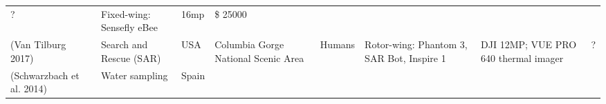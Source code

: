 \documentclass[]{interact}
\theoremstyle{plain}%
\theoremstyle{definition}
\theoremstyle{remark}
\begin{document}
\begin{longtable}[]{@{}llllllll@{}}
\begin{minipage}[t]{0.10\columnwidth}
?\strut
\end{minipage} & \begin{minipage}[t]{0.09\columnwidth}\raggedright\strut
Fixed-wing: Sensefly eBee\strut
\end{minipage} & \begin{minipage}[t]{0.11\columnwidth}\raggedright\strut
16mp\strut
\end{minipage} & \begin{minipage}[t]{0.01\columnwidth}\raggedright\strut
\$ 25000\strut
\end{minipage}\tabularnewline
\begin{minipage}[t]{0.11\columnwidth}\raggedright\strut
(Van Tilburg 2017)\strut
\end{minipage} & \begin{minipage}[t]{0.18\columnwidth}\raggedright\strut
Search and Rescue (SAR)\strut
\end{minipage} & \begin{minipage}[t]{0.03\columnwidth}\raggedright\strut
USA\strut
\end{minipage} & \begin{minipage}[t]{0.14\columnwidth}\raggedright\strut
Columbia Gorge National Scenic Area\strut
\end{minipage} & \begin{minipage}[t]{0.10\columnwidth}\raggedright\strut
Humans\strut
\end{minipage} & \begin{minipage}[t]{0.09\columnwidth}\raggedright\strut
Rotor-wing: Phantom 3, SAR Bot, Inspire 1\strut
\end{minipage} & \begin{minipage}[t]{0.11\columnwidth}\raggedright\strut
DJI 12MP; VUE PRO 640 thermal imager\strut
\end{minipage} & \begin{minipage}[t]{0.01\columnwidth}\raggedright\strut
?\strut
\end{minipage}\tabularnewline
\begin{minipage}[t]{0.11\columnwidth}\raggedright\strut
(Schwarzbach et al. 2014)\strut
\end{minipage} & \begin{minipage}[t]{0.18\columnwidth}\raggedright\strut
Water sampling\strut
\end{minipage} & \begin{minipage}[t]{0.03\columnwidth}\raggedright\strut
Spain\strut
\end{minipage} & \begin{minipage}[t]{0.14\columnwidth}\raggedright\strut

\end{minipage}
\end{longtable}
\end{document}
